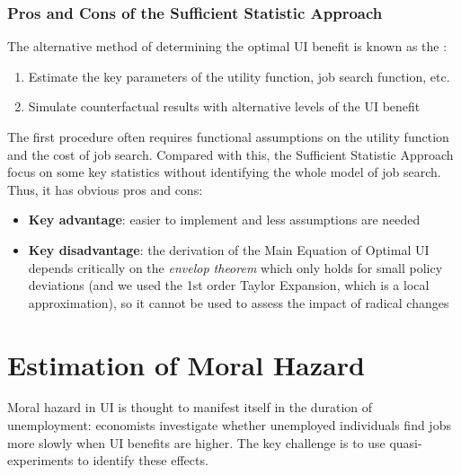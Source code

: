         \subsubsection{Pros and Cons of the Sufficient Statistic Approach}
            The alternative method of determining the optimal UI benefit is known as the :
            \begin{enumerate}
                \item Estimate the key parameters of the utility function, job search function, etc.
                \item Simulate counterfactual results with alternative levels of the UI benefit
            \end{enumerate}
            The first procedure often requires functional assumptions on the utility function and the cost of job search. Compared with this, the Sufficient Statistic Approach focus on some key statistics without identifying the whole model of job search. Thus, it has obvious pros and cons:
            \begin{itemize}
                \item \textbf{Key advantage}: easier to implement and less assumptions are needed
                \item \textbf{Key disadvantage}: the derivation of the Main Equation of Optimal UI depends critically on the \emph{envelop theorem} which only holds for small policy deviations (and we used the 1st order Taylor Expansion, which is a local approximation), so it cannot be used to assess the impact of radical changes
            \end{itemize}

\section{Estimation of Moral Hazard}
    Moral hazard in UI is thought to manifest itself in the duration of unemployment: economists investigate whether unemployed individuals find jobs more slowly when UI benefits are higher. The key challenge is to use quasi-experiments to identify these effects.
    
